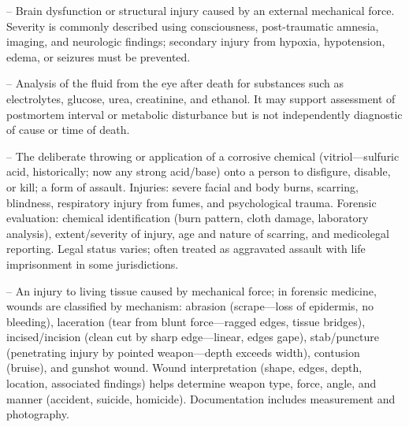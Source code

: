 -- Brain dysfunction or structural injury caused by an external mechanical force. Severity is commonly described using consciousness, post-traumatic amnesia, imaging, and neurologic findings; secondary injury from hypoxia, hypotension, edema, or seizures must be prevented.

-- Analysis of the fluid from the eye after death for substances such as electrolytes, glucose, urea, creatinine, and ethanol. It may support assessment of postmortem interval or metabolic disturbance but is not independently diagnostic of cause or time of death.

-- The deliberate throwing or application of a corrosive chemical (vitriol—sulfuric acid, historically; now any strong acid/base) onto a person to disfigure, disable, or kill; a form of assault. Injuries: severe facial and body burns, scarring, blindness, respiratory injury from fumes, and psychological trauma. Forensic evaluation: chemical identification (burn pattern, cloth damage, laboratory analysis), extent/severity of injury, age and nature of scarring, and medicolegal reporting. Legal status varies; often treated as aggravated assault with life imprisonment in some jurisdictions.

-- An injury to living tissue caused by mechanical force; in forensic medicine, wounds are classified by mechanism: abrasion (scrape—loss of epidermis, no bleeding), laceration (tear from blunt force—ragged edges, tissue bridges), incised/incision (clean cut by sharp edge—linear, edges gape), stab/puncture (penetrating injury by pointed weapon—depth exceeds width), contusion (bruise), and gunshot wound. Wound interpretation (shape, edges, depth, location, associated findings) helps determine weapon type, force, angle, and manner (accident, suicide, homicide). Documentation includes measurement and photography.
